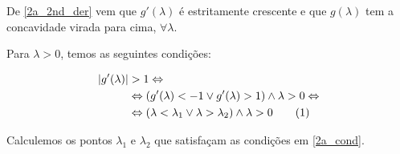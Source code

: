 \documentclass[a4paper, 18pt]{article}
\begin{document}
	\par
	De \eqref{2a_2nd_der} vem que $g'(\lambda)$ é estritamente crescente e que $g(\lambda)$ tem a concavidade virada para cima, $\forall \lambda$.



	\par
	\vspace{.5cm}
	Para $\lambda > 0$, temos as seguintes condições:

	\begin{align*}
		|g'(\lambda)| &> 1 \Leftrightarrow \\ &\Leftrightarrow
		(g'(\lambda) < -1 \vee g'(\lambda) > 1) \wedge \lambda > 0 \Leftrightarrow \\ &\Leftrightarrow
		(\lambda < \lambda_1 \vee \lambda > \lambda_2) \wedge \lambda > 0 \stepcounter{equation}\tag{\theequation}\label{2a_cond}
	\end{align*}

	\par
	Calculemos os pontos $\lambda_1$ e $\lambda_2$ que satisfaçam as condições em \eqref{2a_cond}.
\end{document}
